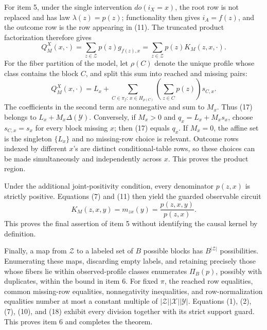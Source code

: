 For item 5, under the single intervention \(do(i_X=x)\), the root row is
not replaced and has law \(\lambda(z)=p(z)\); functionality then gives
\(i_A=f(z)\), and the outcome row is the row appearing in (11).  The
truncated product factorization therefore gives
\[
 Q_M^X(x,\cdot)
 =\sum_{z\in\mathcal Z}p(z)g_{f(z),x}
 =\sum_{z\in\mathcal Z}p(z)K_M(z,x,\cdot).
 \tag{16}
\]
For the fiber partition of the model, let \(\rho(C)\) denote the unique
profile whose class contains the block \(C\), and split this sum into
reached and missing pairs:
\[
 Q_M^X(x,\cdot)
 =L_x+
 \sum_{C\in\pi_f:\,x\in H_{\rho(C)}}
 \left(\sum_{z\in C}p(z)\right)s_{C,x}.
 \tag{17}
\]
The coefficients in the second term are nonnegative and sum to \(M_x\).
Thus (17) belongs to \(L_x+M_x\Delta(\mathcal Y)\).  Conversely, if
\(M_x>0\) and \(q_x=L_x+M_xs_x\), choose
\(s_{C,x}=s_x\) for every block missing \(x\); then (17) equals
\(q_x\).  If \(M_x=0\), the affine set is the singleton \(\{L_x\}\)
and no missing-row choice is relevant.  Outcome rows indexed by different
\(x\)'s are distinct conditional-table rows, so these choices can be made
simultaneously and independently across \(x\).  This proves the product
region.

Under the additional joint-positivity condition, every denominator
\(p(z,x)\) is strictly positive.  Equations (7) and (11) then yield the
guarded observable circuit
\[
 K_M(z,x,y)=m_{zx}(y)=\frac{p(z,x,y)}{p(z,x)}.
 \tag{18}
\]
This proves the final assertion of item 5 without identifying the causal
kernel by definition.

Finally, a map from \(\mathcal Z\) to a labeled set of \(B\) possible
blocks has \(B^{|\mathcal Z|}\) possibilities.  Enumerating these maps,
discarding empty labels, and retaining precisely those whose fibers lie
within observed-profile classes enumerates \(\Pi_B(p)\), possibly with
duplicates, within the bound in item 6.  For fixed \(\pi\), the reached
row equalities, common missing-row equalities, nonnegativity inequalities,
and row-normalization equalities number at most a constant multiple of
\(|\mathcal Z||\mathcal X||\mathcal Y|\).  Equations (1), (2), (7),
(10), and (18) exhibit every division together with its strict support
guard.  This proves item 6 and completes the theorem.